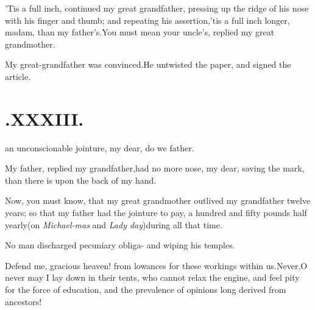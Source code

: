 \documentclass{article}
\begin{document}
\tsh ’Tis a full inch, continued my great grandfather,
pressing up the ridge of his nose with his finger and thumb; and
repeating his assertion,\tsh ’tis a full inch longer,
madam, than my father’s\tsh.\break You must mean your
uncle’s, replied my great grandmother.

\tsh My great-grandfather was convinced.\tsk He
untwisted the paper, and signed the article.

\section{.\quad  XXXIII.}

 an unconscionable\break
jointure, my dear, do we
father.

My father, replied my grandfather,\break had no more nose, my dear,
saving the mark, than there is upon the back of my\break
hand.\tsh

\tsk Now, you must know, that my great grandmother outlived my
grandfather twelve years; so that my father
had the
jointure to pay, a hundred and fifty pounds half yearly\tsk (on
\textit{Michael-\break mas} and \textit{Lady day})\tsk during all
that\break
time.

No man discharged pecuniary obliga-
and wiping his temples.

Defend me, gracious heaven! from 
lowances for these workings within us.\tsk Never,\tsk O never may I lay down in their
tents, who cannot relax the engine, and feel pity for the force of
education, and the prevalence of opinions long derived from
ancestors!
\end{document}
